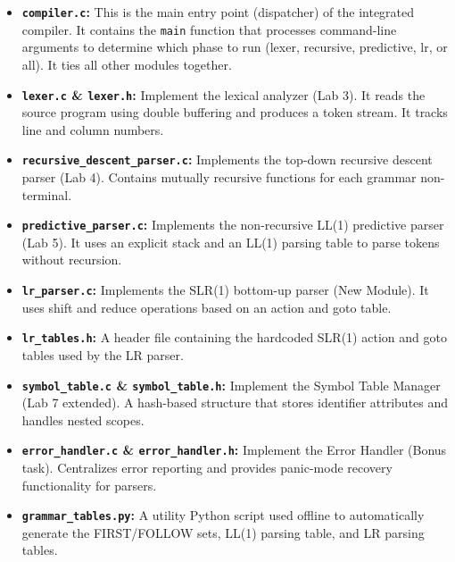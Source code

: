 \documentclass[12pt,a4paper]{article}
\begin{document}
\begin{itemize}
    \item \textbf{\texttt{compiler.c}:} This is the main entry point (dispatcher) of the integrated compiler. It contains the \texttt{main} function that processes command-line arguments to determine which phase to run (lexer, recursive, predictive, lr, or all). It ties all other modules together.
    \item \textbf{\texttt{lexer.c} \& \texttt{lexer.h}:} Implement the lexical analyzer (Lab 3). It reads the source program using double buffering and produces a token stream. It tracks line and column numbers.
    \item \textbf{\texttt{recursive\_descent\_parser.c}:} Implements the top-down recursive descent parser (Lab 4). Contains mutually recursive functions for each grammar non-terminal.
    \item \textbf{\texttt{predictive\_parser.c}:} Implements the non-recursive LL(1) predictive parser (Lab 5). It uses an explicit stack and an LL(1) parsing table to parse tokens without recursion.
    \item \textbf{\texttt{lr\_parser.c}:} Implements the SLR(1) bottom-up parser (New Module). It uses shift and reduce operations based on an action and goto table.
    \item \textbf{\texttt{lr\_tables.h}:} A header file containing the hardcoded SLR(1) action and goto tables used by the LR parser.
    \item \textbf{\texttt{symbol\_table.c} \& \texttt{symbol\_table.h}:} Implement the Symbol Table Manager (Lab 7 extended). A hash-based structure that stores identifier attributes and handles nested scopes.
    \item \textbf{\texttt{error\_handler.c} \& \texttt{error\_handler.h}:} Implement the Error Handler (Bonus task). Centralizes error reporting and provides panic-mode recovery functionality for parsers.
    \item \textbf{\texttt{grammar\_tables.py}:} A utility Python script used offline to automatically generate the FIRST/FOLLOW sets, LL(1) parsing table, and LR parsing tables.
\end{itemize}
\end{document}

